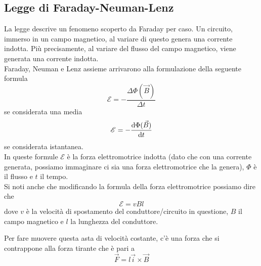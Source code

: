   \subsection{Legge di Faraday-Neuman-Lenz}\label{subsec:mag:fnl}
  La legge descrive un fenomeno scoperto da Faraday per caso. Un circuito, immerso in un campo
  magnetico, al variare di questo genera una corrente indotta. Più precisamente, al variare
  del flusso del campo magnetico, viene generata una corrente indotta.\\
  Faraday, Neuman e Lenz assieme arrivarono alla formulazione della seguente formula
  \begin{equation*}
    \mathcal{E} = -\frac{\Delta\Phi(\vec{B})}{\Delta t}
  \end{equation*}
  se considerata una media
  \begin{equation*}
    \mathcal{E} = -\frac{\mathop{}\!\mathrm{d}\Phi(\vec{B})}{\mathop{}\!\mathrm{d} t}
  \end{equation*}
  se considerata istantanea.\\
  In queste formule $\mathcal{E}$ è la forza elettromotrice indotta (dato che con una corrente
  generata, possiamo immaginare ci sia una forza elettromotrice che la genera), $\Phi$ è il flusso
  e $t$ il tempo.\\
  Si noti anche che modificando la formula della forza elettromotrice possiamo dire che
  \begin{equation*}
    \mathcal{E} = vBl
  \end{equation*}
  dove $v$ è la velocità di spostamento del conduttore/circuito in questione, $B$ il campo magnetico
  e $l$ la lunghezza del conduttore.
  \begin{center}
  \end{center}
  Per fare muovere questa asta di velocità costante, c'è una forza che si contrappone alla forza
  tirante che è pari a
  \begin{equation*}
    \vec{F} = l\vec{i}\times\vec{B}
  \end{equation*}

